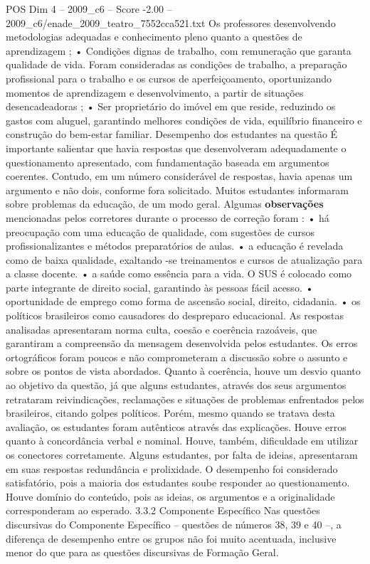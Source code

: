 \begin{textsample}{POS Dim 4 – 2009\_c6 – Score -2.00 – 2009\_c6/enade\_2009\_teatro\_7552cca521.txt}
Os professores desenvolvendo metodologias adequadas e conhecimento pleno quanto a questões de aprendizagem ; • Condições dignas de trabalho, com remuneração que garanta qualidade de vida.
Foram consideradas as condições de trabalho, a preparação profissional para o trabalho e os cursos de aperfeiçoamento, oportunizando momentos de aprendizagem e desenvolvimento, a partir de situações desencadeadoras ; • Ser proprietário do imóvel em que reside, reduzindo os gastos com aluguel, garantindo melhores condições de vida, equilíbrio financeiro e construção do bem-estar familiar.
Desempenho dos estudantes na questão É importante salientar que havia respostas que desenvolveram adequadamente o questionamento apresentado, com fundamentação baseada em argumentos coerentes.
Contudo, em um número considerável de respostas, havia apenas um argumento e não dois, conforme fora solicitado.
Muitos estudantes informaram sobre problemas da educação, de um modo geral.
Algumas \textbf{observações} mencionadas pelos corretores durante o processo de correção foram : • há preocupação com uma educação de qualidade, com sugestões de cursos profissionalizantes e métodos preparatórios de aulas. • a educação é revelada como de baixa qualidade, exaltando -se treinamentos e cursos de atualização para a classe docente. • a saúde como essência para a vida.
O SUS é colocado como parte integrante de direito social, garantindo às pessoas fácil acesso. • oportunidade de emprego como forma de ascensão social, direito, cidadania. • os políticos brasileiros como causadores do despreparo educacional.
As respostas analisadas apresentaram norma culta, coesão e coerência razoáveis, que garantiram a compreensão da mensagem desenvolvida pelos estudantes.
Os erros ortográficos foram poucos e não comprometeram a discussão sobre o assunto e sobre os pontos de vista abordados.
Quanto à coerência, houve um desvio quanto ao objetivo da questão, já que alguns estudantes, através dos seus argumentos retrataram reivindicações, reclamações e situações de problemas enfrentados pelos brasileiros, citando golpes políticos.
Porém, mesmo quando se tratava desta avaliação, os estudantes foram autênticos através das explicações.
Houve erros quanto à concordância verbal e nominal.
Houve, também, dificuldade em utilizar os conectores corretamente.
Alguns estudantes, por falta de ideias, apresentaram em suas respostas redundância e prolixidade.
O desempenho foi considerado satisfatório, pois a maioria dos estudantes soube responder ao questionamento.
Houve domínio do conteúdo, pois as ideias, os argumentos e a originalidade corresponderam ao esperado. 3.3.2 Componente Específico Nas questões discursivas do Componente Específico – questões de números 38, 39 e 40 –, a diferença de desempenho entre os grupos não foi muito acentuada, inclusive menor do que para as questões discursivas de Formação Geral.

\end{textsample}
